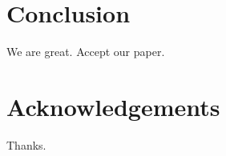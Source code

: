 \documentclass[pldi]{sigplanconf-pldi15}
\begin{document}





\section{Conclusion}

We are
great. Accept our paper.


\section{Acknowledgements}

Thanks.


{}
\end{document}
